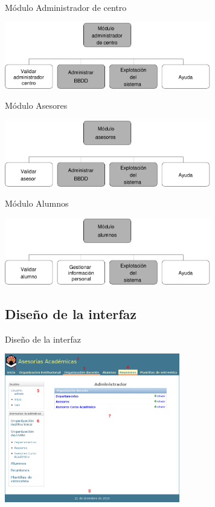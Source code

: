 \documentclass[10pt, hyperref={pdfpagelabels=false}]{beamer}
\begin{document}
      \begin{frame}{Módulo Administrador de centro}
        \begin{center}
          \includegraphics[width=9cm]{Diagramas/moduloAdminCentro}
        \end{center}
      \end{frame}

      \begin{frame}{Módulo Asesores}
        \begin{center}
          \includegraphics[width=9cm]{Diagramas/moduloAsesores}
        \end{center}
      \end{frame}

      \begin{frame}{Módulo Alumnos}
        \begin{center}
          \includegraphics[width=9cm]{Diagramas/moduloAlumnos}
        \end{center}
      \end{frame}

    \subsection{Diseño de la interfaz}
      \begin{frame}{Diseño de la interfaz}
        \begin{center}
          \includegraphics[height=6.5cm]{Diagramas/gestion_informacion.png}
        \end{center}
      \end{frame}
\end{document}
